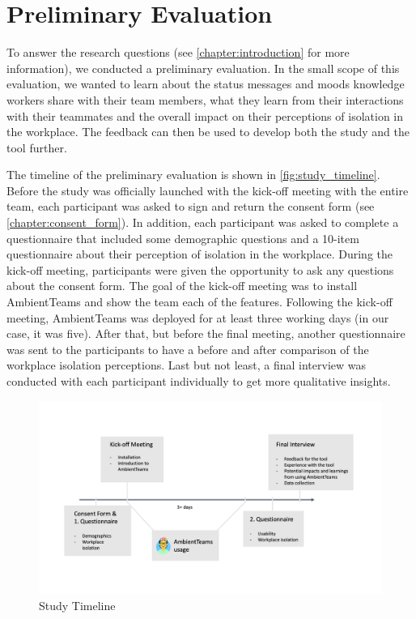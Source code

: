\chapter{Preliminary Evaluation}
\label{chapter:preliminary_evaluation}
To answer the research questions (see \autoref{chapter:introduction} for more information), we conducted a preliminary evaluation. In the small scope of this evaluation, we wanted to learn about the status messages and moods knowledge workers share with their team members, what they learn from their interactions with their teammates and the overall impact on their perceptions of isolation in the workplace. The feedback can then be used to develop both the study and the tool further.

The timeline of the preliminary evaluation is shown in \autoref{fig:study_timeline}. Before the study was officially launched with the kick-off meeting with the entire team, each participant was asked to sign and return the consent form (see \autoref{chapter:consent_form}). In addition, each participant was asked to complete a questionnaire that included some demographic questions and a 10-item questionnaire about their perception of isolation in the workplace. During the kick-off meeting, participants were given the opportunity to ask any questions about the consent form. The goal of the kick-off meeting was to install AmbientTeams and show the team each of the features. Following the kick-off meeting, AmbientTeams was deployed for at least three working days (in our case, it was five). After that, but before the final meeting, another questionnaire was sent to the participants to have a before and after comparison of the workplace isolation perceptions. Last but not least, a final interview was conducted with each participant individually to get more qualitative insights.

\begin{figure}[h]
    \centering
    \includegraphics[width=\linewidth]{./images/Study_Timeline.png}
    \caption{Study Timeline}
    \label{fig:study_timeline}
\end{figure}

